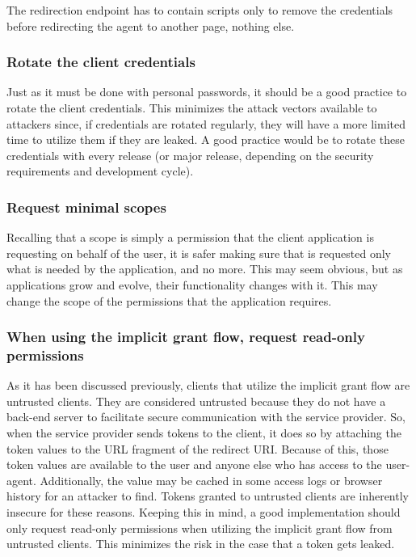 The redirection endpoint has to contain scripts only to remove the credentials before redirecting the agent to another page, nothing else.

\subsubsection{Rotate the client credentials}
Just as it must be done with personal passwords, it should be a good practice to rotate the client credentials. This minimizes the attack vectors available to attackers since, if credentials are rotated regularly, they will have a more limited time to utilize them if they are leaked.
A good practice would be to rotate these credentials with every release (or major release, depending on the security requirements and development cycle).

\subsubsection{Request minimal scopes}
Recalling that a scope is simply a permission that the client application is requesting on behalf of the user, it is safer making sure that is requested only what is needed by the application, and no more. This may seem obvious, but as applications grow and evolve, their functionality changes with it. This may change the scope of the permissions that the application requires.

\subsubsection{When using the implicit grant flow, request read-only permissions}
As it has been discussed previously, clients that utilize the implicit grant flow are untrusted clients.
They are considered untrusted because they do not have a back-end server to facilitate secure communication with the service provider. So, when the service provider sends tokens to the client, it does so by attaching the token values to the URL fragment of the redirect URI. Because of this, those token values are available to the user and anyone else who has access to the user-agent. Additionally, the value may be cached in some access logs or browser history for an attacker to find.
Tokens granted to untrusted clients are inherently insecure for these reasons. Keeping this in mind, a good implementation should only request read-only permissions when utilizing the implicit grant flow from untrusted clients. This minimizes the risk in the case that a token gets leaked.


